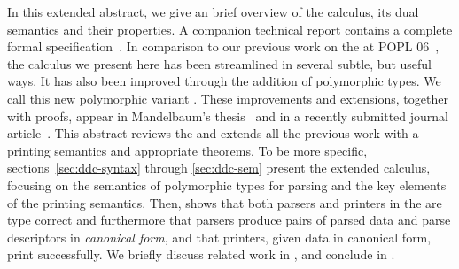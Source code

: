 


In this extended abstract, we give an brief overview of the calculus,
its dual semantics and their properties.  A companion technical
report contains a complete formal
specification~\cite{fisher+:popl-sub-long}.  In comparison to our
previous work on the \ddcold{} at POPL 06~\cite{fisher+:next700ddl},
the calculus we present here has been streamlined in several subtle,
but useful ways.  It has also been improved through the addition of
polymorphic types.  We call this new polymorphic variant
\ddc{}.  These improvements and extensions, together with
proofs, appear in Mandelbaum's thesis~\cite{mandelbaum:thesis} and in
a recently submitted journal article~\cite{fisher+:ddcjournal}.
This abstract reviews the \ddc{} and extends all the previous 
work with a printing semantics and appropriate theorems.
To be more specific,
sections~\ref{sec:ddc-syntax} through \ref{sec:ddc-sem} present the
extended \ddc{} calculus, focusing on the semantics of polymorphic
types for parsing and the key elements of the printing semantics.
Then,  shows that both parsers and
printers in the \ddc{} are type correct and furthermore that parsers
produce pairs of parsed data and parse descriptors in {\em canonical
  form}, and that printers, given data in canonical form, print
successfully. We briefly discuss related work in , and
conclude in .

